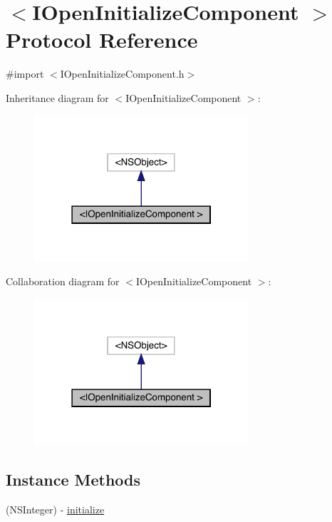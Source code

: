\hypertarget{protocol_i_open_initialize_component_01-p}{}\section{$<$I\+Open\+Initialize\+Component $>$ Protocol Reference}
\label{protocol_i_open_initialize_component_01-p}


{\ttfamily \#import $<$I\+Open\+Initialize\+Component.\+h$>$}



Inheritance diagram for $<$I\+Open\+Initialize\+Component $>$\+:\nopagebreak
\begin{figure}[H]
\begin{center}
\leavevmode
\includegraphics[width=226pt]{protocol_i_open_initialize_component_01-p__inherit__graph}
\end{center}
\end{figure}


Collaboration diagram for $<$I\+Open\+Initialize\+Component $>$\+:\nopagebreak
\begin{figure}[H]
\begin{center}
\leavevmode
\includegraphics[width=226pt]{protocol_i_open_initialize_component_01-p__coll__graph}
\end{center}
\end{figure}
\subsection*{Instance Methods}
\begin{DoxyCompactItemize}
\item 
(N\+S\+Integer) -\/ \mbox{\hyperlink{protocol_i_open_initialize_component_01-p_a3b5b64201fe4578dd606d576c4bc5733}{initialize}}
\end{DoxyCompactItemize}


